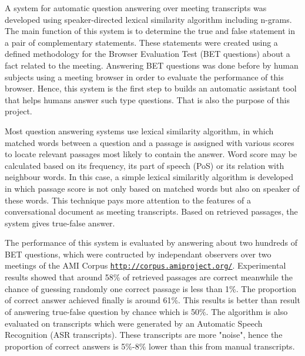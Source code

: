




A system for automatic question answering over meeting transcripts was developed using speaker-directed lexical similarity algorithm including n-grams. The main function of this system is to determine the true and false statement in a pair of complementary statements. These statements were created using a defined methodology for the Browser Evaluation Test (BET questions) \cite{BET} about a fact related to the meeting. Answering BET questions was done before by human subjects using a meeting browser in order to evaluate the performance of this browser. Hence, this system is the first step to builds an automatic assistant tool that helps humans answer such type questions. That is also the purpose of this project.

Most question answering systems use lexical similarity algorithm, in which matched words between a question and a passage is assigned with various scores to locate relevant passages most likely to contain the answer. Word score may be calculated based on its frequency, its part of speech (PoS) or its relation with neighbour words. In this case, a simple lexical similaritly algorithm is developed in which passage score is not only based on matched words but also on speaker of these words. This technique pays more attention to the features of a conversational document as meeting transcripts. Based on retrieved passages, the system gives true-false answer.

The performance of this system is evaluated by answering about two hundreds of BET questions, which were contructed by independant observers over two meetings of the AMI Corpus \href{http://corpus.amiproject.org/}{\texttt{http://corpus.amiproject.org/}}. Experimental results showed that around 58\% of retrieved passages are correct meanwhile the chance of guessing randomly one correct passage is less than 1\%. The proportion of correct answer achieved finally is around 61\%. This results is better than result of answering true-false question by chance which is 50\%. The algorithm is also evaluated on transcripts which were generated by an Automatic Speech Recognition (ASR transcripts). These transcripts are more "noise", hence the proportion of correct answers is 5\%-8\% lower than this from manual transcripts. 


